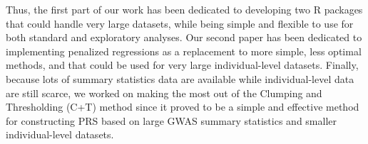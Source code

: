 Thus, the first part of our work has been dedicated to developing two R packages that could handle very large datasets, while being simple and flexible to use for both standard and exploratory analyses. 
Our second paper has been dedicated to implementing penalized regressions as a replacement to more simple, less optimal methods, and that could be used for very large individual-level datasets.
Finally, because lots of summary statistics data are available while individual-level data are still scarce, we worked on making the most out of the Clumping and Thresholding (C+T) method since it proved to be a simple and effective method for constructing PRS based on large GWAS summary statistics and smaller individual-level datasets.
